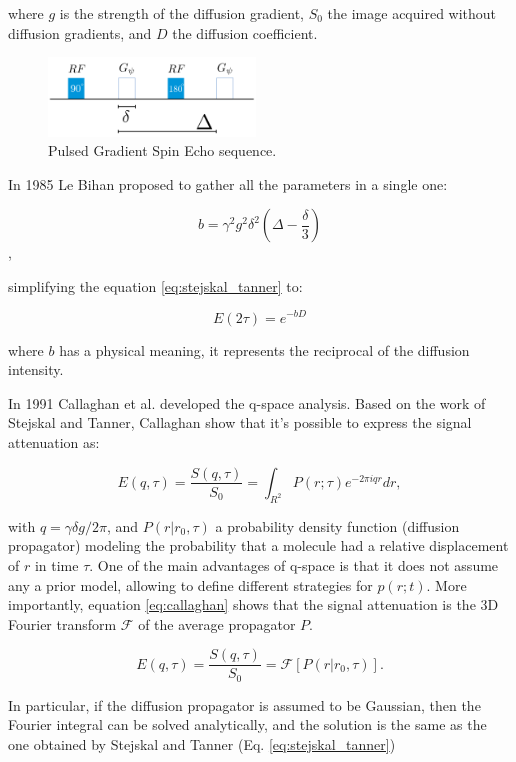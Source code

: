 where $g$ is the strength of the diffusion gradient, $S_0$ the
image acquired without diffusion gradients, and $D$ the diffusion coefficient.

\begin{figure}
    \includegraphics[width=0.49\textwidth]{3.mri/img/fgp.png}
    \caption{Pulsed Gradient Spin Echo sequence.}
    \label{fig:fgp}
\end{figure}  

In 1985 Le Bihan \cite{LEBIHAN} proposed to gather all the parameters in a
single one: 

$$ b = \gamma^2 g^2 \delta^2 \left(\Delta - \frac{\delta}{3}\right) $$ ,

simplifying the equation \ref{eq:stejskal_tanner} to:

$$ E(2\tau) = e^{-b D} $$

where $b$ has a physical meaning, it represents the reciprocal of the diffusion
intensity\cite{LEBIHAN}.

In 1991 Callaghan et al. \cite{Callaghan1991} developed the q-space analysis.
Based on the work of Stejskal and Tanner, Callaghan show that it's possible
to express the signal attenuation as:

\begin{equation}
\label{eq:callaghan}
E(q,\tau) =  \frac{S(q,\tau)}{S_0} = \int_{R^2}{P(r;\tau)e^{-2\pi i q r} dr},
\end{equation}

with $q =  \gamma \delta g / 2\pi$, and $P(r|r_0, \tau)$ a probability density
function (diffusion propagator) modeling the probability that a molecule had a
relative displacement of $r$ in time $\tau$. One of the main advantages of
q-space is that it does not assume any a prior model, allowing to define 
different strategies for $p(r;t)$. More importantly, equation
\ref{eq:callaghan} shows that the signal attenuation is the 3D Fourier
transform $\mathcal{F}$ of the average propagator $P$. 

\begin{equation}
    \label{eq:fourier_callaghan}
    E(q, \tau) = \frac{S(q, \tau)}{S_0} =
    \mathcal{F}[P(r|r_0, \tau)].
\end{equation}

In particular, if the diffusion propagator is assumed to be Gaussian, then the
Fourier integral can be solved analytically, and the solution is the same
as the one obtained by Stejskal and Tanner (Eq. \ref{eq:stejskal_tanner})

